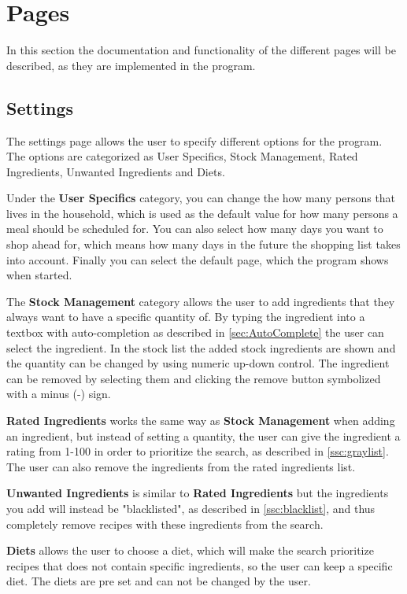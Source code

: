 \chapter{Pages}
In this section the documentation and functionality of the different pages will be described, as they are implemented in the program.

\section{Settings} \label{ss:settings}
The settings page allows the user to specify different options for the program. The options are categorized as User Specifics, Stock Management, Rated Ingredients, Unwanted Ingredients and Diets.

Under the \textbf{User Specifics} category, you can change the how many persons that lives in the household, which is used as the default value for how many persons a meal should be scheduled for. You can also select how many days you want to shop ahead for, which means how many days in the future the shopping list takes into account. Finally you can select the default page, which the program shows when started.

The \textbf{Stock Management} category allows the user to add ingredients that they always want to have a specific quantity of. By typing the ingredient into a textbox with auto-completion as described in \cref{sec:AutoComplete} the user can select the ingredient. In the stock list the added stock ingredients are shown and the quantity can be changed by using numeric up-down control. The ingredient can be removed by selecting them and clicking the remove button symbolized with a minus (-) sign.

\textbf{Rated Ingredients} works the same way as \textbf{Stock Management} when adding an ingredient, but instead of setting a quantity, the user can give the ingredient a rating from 1-100 in order to prioritize the search, as described in \cref{ssc:graylist}. The user can also remove the ingredients from the rated ingredients list.

\textbf{Unwanted Ingredients} is similar to \textbf{Rated Ingredients} but the ingredients you add will instead be "blacklisted", as described in \cref{ssc:blacklist}, and thus completely remove recipes with these ingredients from the search.

\textbf{Diets} allows the user to choose a diet, which will make the search prioritize recipes that does not contain specific ingredients, so the user can keep a specific diet. The diets are pre set and can not be changed by the user.

